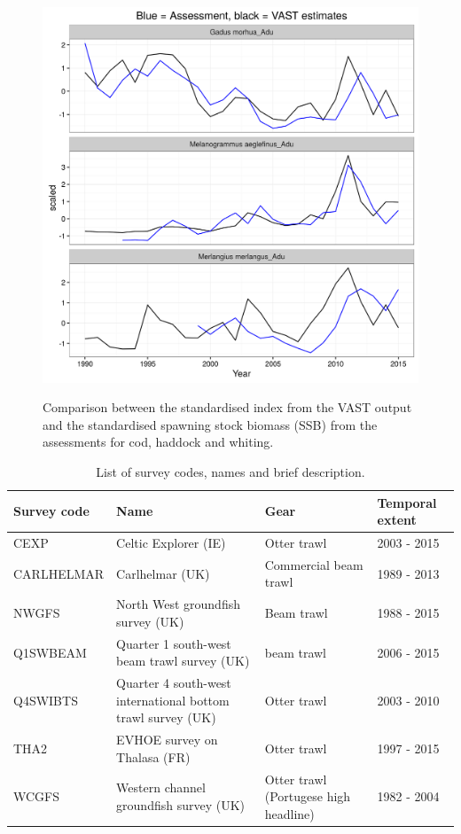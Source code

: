 \documentclass{article}
\begin{document}
\begin{figure}[!ht]
\begin{center}
	\includegraphics[width =0.9\linewidth]{"figures/RealativeIndexVRelativeAssessSSB"}
	\label{fig:S14}
	\caption{Comparison between the standardised index from the VAST
		output and the standardised spawning stock biomass (SSB) from
		the assessments for cod, haddock and whiting.}
	\end{center}
\end{figure}

\begin{table}[!ht]
	\caption{List of survey codes, names and brief description.}
	\center
	\begin{tabular}{ p{3cm} p{4cm} p{4cm} p{3cm} }
		\hline
		Survey code    & Name 	& Gear & Temporal extent \\
		\hline
		CEXP           & Celtic Explorer (IE)   & Otter trawl & 2003 - 2015 \\
		CARLHELMAR     & Carlhelmar (UK)	& Commercial beam trawl & 1989 - 2013 \\
		NWGFS          & North West groundfish survey (UK) & Beam trawl & 1988 - 2015 \\
		Q1SWBEAM       & Quarter 1 south-west beam trawl survey (UK) 	& beam trawl & 2006 - 2015 \\
		Q4SWIBTS       & Quarter 4 south-west international bottom trawl survey (UK) & Otter trawl & 2003 - 2010 \\
		THA2           & EVHOE survey on Thalasa (FR) & Otter trawl & 1997 - 2015 \\
		WCGFS          & Western channel groundfish survey (UK) & Otter
		trawl (Portugese high headline) & 1982 - 2004 \\
		\hline
	\end{tabular}
\end{table}
\end{document}
